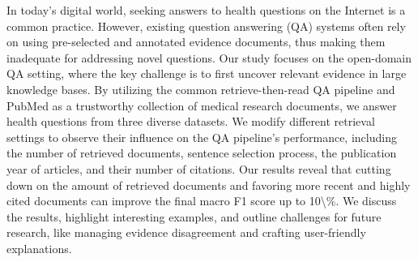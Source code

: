 In today's digital world, seeking answers to health questions on the Internet is a common practice. However, existing question answering (QA) systems often rely on using pre-selected and annotated evidence documents, thus making them inadequate for addressing novel questions. Our study focuses on the open-domain QA setting, where the key challenge is to first uncover relevant evidence in large knowledge bases. By utilizing the common retrieve-then-read QA pipeline and PubMed as a trustworthy collection of medical research documents, we answer health questions from three diverse datasets. We modify different retrieval settings to observe their influence on the QA pipeline's performance, including the number of retrieved documents, sentence selection process, the publication year of articles, and their number of citations. Our results reveal that cutting down on the amount of retrieved documents and favoring more recent and highly cited documents can improve the final macro F1 score up to 10\textbackslash{}\%. We discuss the results, highlight interesting examples, and outline challenges for future research, like managing evidence disagreement and crafting user-friendly explanations.